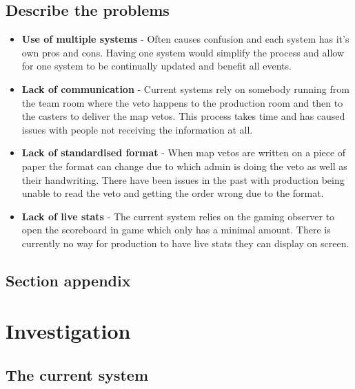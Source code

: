 \subsection{Describe the problems}
\begin{itemize}
	\item \textbf{Use of multiple systems}  - Often causes confusion and each system has it's own pros and cons. Having one system would simplify the process and allow for one system to be continually updated and benefit all events.
	\item \textbf{Lack of communication} - Current systems rely on somebody running from the team room where the veto happens to the production room and then to the casters to deliver the map vetos. This process takes time and has caused issues with people not receiving the information at all.
	\item \textbf{Lack of standardised format} - When map vetos are written on a piece of  paper the format can change due to which admin is doing the veto as well as their handwriting. There have been issues in the past with production being unable to read the veto and getting the order wrong due to the format.
	\item \textbf{Lack of live stats} - The current system relies on the gaming observer to open the scoreboard in game which only has a minimal amount. There is currently no way for production to have live stats they can display on screen.
\end{itemize}

\subsection{Section appendix}

\section{Investigation}

\subsection{The current system}

